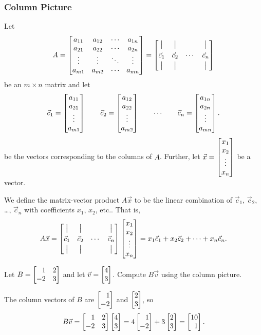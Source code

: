 \subsubsection*{Column Picture}
Let 
\[
	A=
	\begin{bmatrix}
				{a_{11}} & {a_{12}} & {\cdots} & {a_{1n}}\\
				{a_{21}} & {a_{22}} & {\cdots} & {a_{2n}}\\
				{\vdots} & {\vdots} & {\ddots} & {\vdots}\\
				{a_{m1}} & {a_{m2}} & {\cdots} & {a_{mn}}
				\end{bmatrix}=
			\begin{bmatrix}\big|&\big|&&\big|\\[3pt]
			\vec c_1&\vec c_2&\cdots&\vec c_n\\[2pt]
			\big|&\big|&&\big|\end{bmatrix}
\]
be an $m\times n$ matrix and let 
\[
	\vec c_1=\begin{bmatrix}a_{11}\\a_{21}\\\vdots\\a_{m1}\end{bmatrix}\qquad
	\vec c_2=\begin{bmatrix}a_{12}\\a_{22}\\\vdots\\a_{m2}\end{bmatrix}\qquad\cdots\qquad
	\vec c_n=\begin{bmatrix}a_{1n}\\a_{2n}\\\vdots\\a_{mn}\end{bmatrix}.
\]
be the vectors corresponding to the columns of $A$. Further, let $\vec x=\begin{bmatrix}x_1\\x_2\\\vdots\\x_n\end{bmatrix}$ be a vector.

We define the matrix-vector product $A\vec x$ to be the linear combination of $\vec c_1$, $\vec c_2$, \ldots, $\vec c_n$ with coefficients
$x_1$, $x_2$, etc.. That is,
\[
	A\vec x =
			\begin{bmatrix}\big|&\big|&&\big|\\[3pt]
			\vec c_1&\vec c_2&\cdots&\vec c_n\\[2pt]
			\big|&\big|&&\big|\end{bmatrix}\begin{bmatrix}x_1\\x_2\\\vdots\\x_n\end{bmatrix}
	=x_1\vec c_1+x_2\vec c_2+\cdots+x_n\vec c_n.
\]

\begin{example}Let $B=\mat{1&2\\-2&3}$ and let $\vec v=\mat{4\\3}$. Compute $B\vec v$ using the column picture.

	The column vectors of $B$ are $\mat{1\\-2}$ and $\mat{2\\3}$, so
	\[
		B\vec v=\mat{1&2\\-2&3}\mat{4\\3} = 4\mat{1\\-2} + 3\mat{2\\3}=\mat{10\\1}.
	\]
\end{example}

